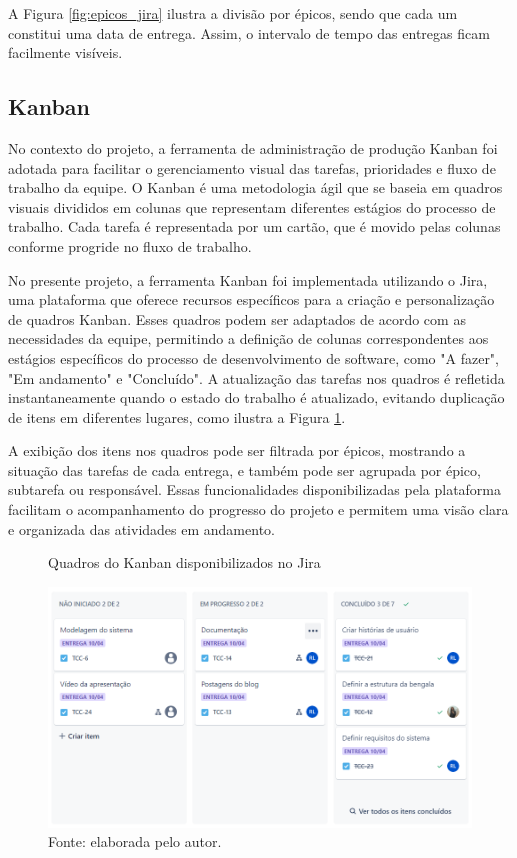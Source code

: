     A Figura \ref{fig:epicos_jira} ilustra a divisão por épicos, sendo que cada um constitui uma data de entrega. Assim, o intervalo de tempo das entregas ficam facilmente visíveis. 

    
    \subsection{Kanban}
    No contexto do projeto, a ferramenta de administração de produção Kanban foi adotada para facilitar o gerenciamento visual das tarefas, prioridades e fluxo de trabalho da equipe. O Kanban é uma metodologia ágil que se baseia em quadros visuais divididos em colunas que representam diferentes estágios do processo de trabalho. Cada tarefa é representada por um cartão, que é movido pelas colunas conforme progride no fluxo de trabalho.

    No presente projeto, a ferramenta Kanban foi implementada utilizando o Jira, uma plataforma que oferece recursos específicos para a criação e personalização de quadros Kanban. Esses quadros podem ser adaptados de acordo com as necessidades da equipe, permitindo a definição de colunas correspondentes aos estágios específicos do processo de desenvolvimento de software, como "A fazer", "Em andamento"  e "Concluído". A atualização das tarefas nos quadros é refletida instantaneamente quando o estado do trabalho é atualizado, evitando duplicação de itens em diferentes lugares, como ilustra a Figura \ref{fig:kanban}.
    
    A exibição dos itens nos quadros pode ser filtrada por épicos, mostrando a situação das tarefas de cada entrega, e também pode ser agrupada por épico, subtarefa ou responsável. Essas funcionalidades disponibilizadas pela plataforma facilitam o acompanhamento do progresso do projeto e permitem uma visão clara e organizada das atividades em andamento.

    \begin{figure}[h!]
        \captionsetup{width=1\textwidth}
        \caption{\label{fig:kanban} Quadros do Kanban disponibilizados no Jira}
        \centering
        \includegraphics[width=1\textwidth]{figuras/kanban} 
        \caption*{Fonte: elaborada pelo autor.}
    \end{figure}

